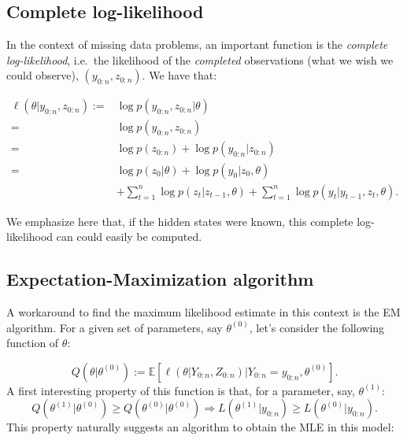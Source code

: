 \documentclass[]{book}
\begin{document}
\hypertarget{complete-log-likelihood}{%
\subsection{Complete log-likelihood}\label{complete-log-likelihood}}

In the context of missing data problems, an important function is the \emph{complete log-likelihood}, i.e.~the likelihood of the \emph{completed} observations (what we wish we could observe), \((y_{0:n}, z_{0:n})\).
We have that:

\begin{align}
\ell(\theta \vert y_{0:n}, z_{0:n}) :=& \log p(y_{0:n}, z_{0:n} \vert \theta) \nonumber \\
=& \log p(y_{0:n}, z_{0:n}) \nonumber \\
=& \log p(z_{0:n}) + \log p(y_{0:n}\vert z_{0:n}) \nonumber \\
=&  \log p(z_0 \vert \theta) + \log p(y_0\vert z_0, \theta) \nonumber \\ 
&+ \sum_{t = 1}^n \log p(z_{t} \vert z_{t - 1}, \theta) + \sum_{t = 1}^n \log p(y_{t}\vert y_{t -1}, z_{t}, \theta)  \label{eq:AR-HMM-complete-log-likelihood}.
\end{align}

We emphasize here that, if the hidden states were known, this complete log-likelihood can could easily be computed.

\hypertarget{expectation-maximization-algorithm}{%
\subsection{Expectation-Maximization algorithm}\label{expectation-maximization-algorithm}}

A workaround to find the maximum likelihood estimate in this context is the EM algorithm.
For a given set of parameters, say \(\theta^{(0)}\), let's consider the following function of \(\theta\):

\begin{equation}
Q(\theta \vert \theta^{(0)}) := \mathbb{E}[\ell(\theta \vert Y_{0:n}, Z_{0:n}) \vert Y_{0:n} = y_{0:n}, \theta^{(0)}] \label{eq:E-step-function}.
\end{equation}
A first interesting property of this function is that, for a parameter, say, \(\theta^{(1)}\):
\[Q(\theta^{(1)} \vert \theta^{(0)}) \geq Q(\theta^{(0)} \vert \theta^{(0)}) \Rightarrow L(\theta^{(1)} \vert y_{0:n}) \geq L(\theta^{(0)} \vert y_{0:n}).\]
This property naturally suggests an algorithm to obtain the MLE in this model:
\end{document}

